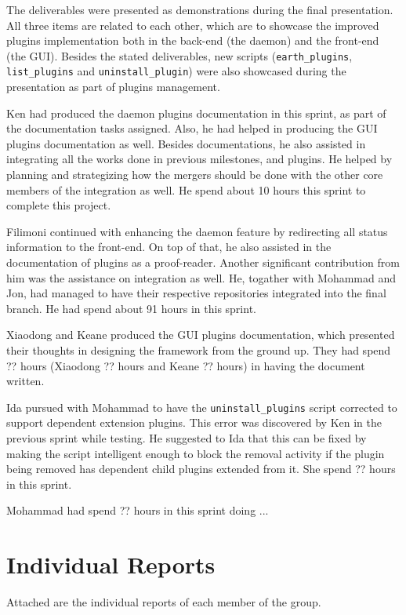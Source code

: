 \documentclass{article}
\begin{document}
The deliverables were presented as demonstrations during the final presentation. All three items are related to each other, which are to showcase the improved plugins implementation both in the back-end (the daemon) and the front-end (the GUI). Besides the stated deliverables, new scripts (\texttt{earth\_plugins}, \texttt{list\_plugins} and \texttt{uninstall\_plugin}) were also showcased during the presentation as part of plugins management.

Ken had produced the daemon plugins documentation in this sprint, as part of the documentation tasks assigned. Also, he had helped in producing the GUI plugins documentation as well. Besides documentations, he also assisted in integrating all the works done in previous milestones, and plugins. He helped by planning and strategizing how the mergers should be done with the other core members of the integration as well. He spend about 10 hours this sprint to complete this project. 

Filimoni continued with enhancing the daemon feature by redirecting all status information to the front-end. On top of that, he also assisted in the documentation of plugins as a proof-reader. Another significant contribution from him was the assistance on integration as well. He, togather with Mohammad and Jon, had managed to have their respective repositories integrated into the final branch. He had spend about 91 hours in this sprint. 

Xiaodong and Keane produced the GUI plugins documentation, which presented their thoughts in designing the framework from the ground up. They had spend ?? hours (Xiaodong ?? hours and Keane ?? hours) in having the document written.

Ida pursued with Mohammad to have the \texttt{uninstall\_plugins} script corrected to support dependent extension plugins. This error was discovered by Ken in the previous sprint while testing. He suggested to Ida that this can be fixed by making the script intelligent enough to block the removal activity if the plugin being removed has dependent child plugins extended from it. She spend ?? hours in this sprint. 

Mohammad had spend ?? hours in this sprint doing ...
 
\section*{Individual Reports}

Attached are the individual reports of each member of the group. 



%



%

%

%

%
\end{document}
